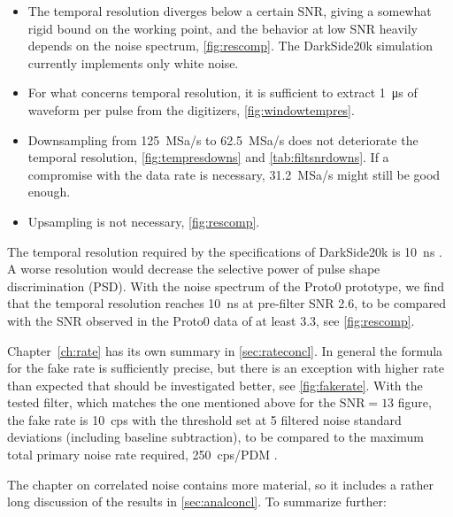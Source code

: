 \begin{itemize}
    
    \item The temporal resolution diverges below a certain SNR, giving a
    somewhat rigid bound on the working point, and the behavior at low SNR
    heavily depends on the noise spectrum, \autoref{fig:rescomp}. The
    DarkSide20k simulation currently implements only white noise.
    
    \item For what concerns temporal resolution, it is sufficient to extract
    \SI{1}{\micro s} of waveform per pulse from the digitizers,
    \autoref{fig:windowtempres}.
    
    \item Downsampling from \SI{125}{MSa/s} to \SI{62.5}{MSa/s} does not
    deteriorate the temporal resolution, \autoref{fig:tempresdowns} and
    \autoref{tab:filtsnrdowns}. If a compromise with the data rate is
    necessary, \SI{31.2}{MSa/s} might still be good enough.
    
    \item Upsampling is not necessary, \autoref{fig:rescomp}.
    
\end{itemize}

The temporal resolution required by the specifications of DarkSide20k is
\SI{10}{ns} \cite[30]{aalseth2018}. A worse resolution would decrease the
selective power of pulse shape discrimination (PSD). With the noise spectrum of
the Proto0 prototype, we find that the temporal resolution reaches \SI{10}{ns}
at pre-filter SNR 2.6, to be compared with the SNR observed in the Proto0 data
of at least 3.3, see \autoref{fig:rescomp}.

Chapter~\ref{ch:rate} has its own summary in \autoref{sec:rateconcl}. In
general the formula for the fake rate is sufficiently precise, but there is an
exception with higher rate than expected that should be investigated better,
see \autoref{fig:fakerate}. With the tested filter, which matches the one
mentioned above for the $\mathrm{SNR} = 13$ figure, the fake rate is
\SI{10}{cps} with the threshold set at 5 filtered noise standard deviations
(including baseline subtraction), to be compared to the maximum total primary
noise rate required, \SI{250}{cps/PDM} \cite[30]{aalseth2018}.

The chapter on correlated noise contains more material, so it includes a rather
long discussion of the results in \autoref{sec:analconcl}. To summarize
further:

